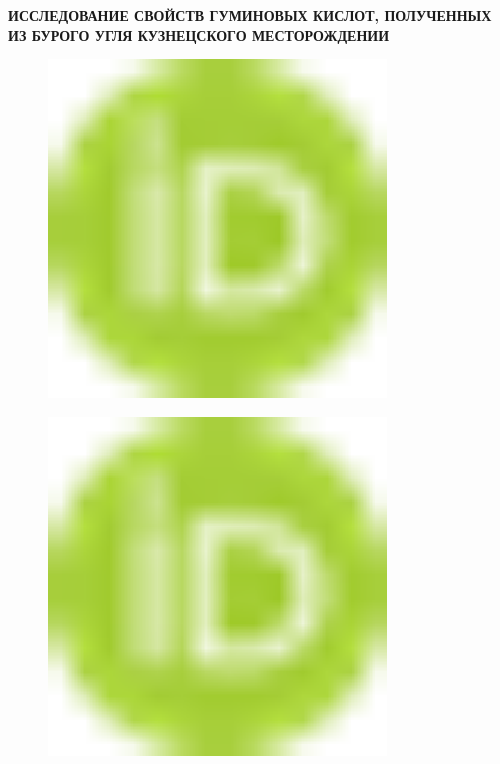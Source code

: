 
{\bfseries ИССЛЕДОВАНИЕ СВОЙСТВ ГУМИНОВЫХ КИСЛОТ, ПОЛУЧЕННЫХ ИЗ БУРОГО УГЛЯ
КУЗНЕЦСКОГО МЕСТОРОЖДЕНИИ}

\begin{figure}[H]
	\centering
	\includegraphics[width=0.8\textwidth]{media/gorn3/image1}
	\caption*{}
\end{figure}

\begin{figure}[H]
	\centering
	\includegraphics[width=0.8\textwidth]{media/gorn3/image1}
	\caption*{}
\end{figure}

